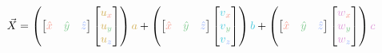 \documentclass[preview]{standalone}
\begin{document}
$$\vec{X} =
\left(\begin{bmatrix}\textcolor[HTML]{f59789}{\hat{x}}&\textcolor[HTML]{7dc98c}{\hat{y}}&\textcolor[HTML]{96b1fe}{\hat{z}}\end{bmatrix}\begin{bmatrix}\textcolor[HTML]{d2b057}{u}_{\textcolor[HTML]{f59789}{x}}\\\textcolor[HTML]{d2b057}{u}_{\textcolor[HTML]{7dc98c}{y}}\\\textcolor[HTML]{d2b057}{u}_{\textcolor[HTML]{96b1fe}{z}}\end{bmatrix}\right)\textcolor[HTML]{d2b057}{a} +
\left(\begin{bmatrix}\textcolor[HTML]{f59789}{\hat{x}}&\textcolor[HTML]{7dc98c}{\hat{y}}&\textcolor[HTML]{96b1fe}{\hat{z}}\end{bmatrix}\begin{bmatrix}\textcolor[HTML]{43c8dc}{v}_{\textcolor[HTML]{f59789}{x}}\\\textcolor[HTML]{43c8dc}{v}_{\textcolor[HTML]{7dc98c}{y}}\\\textcolor[HTML]{43c8dc}{v}_{\textcolor[HTML]{96b1fe}{z}}\end{bmatrix}\right)\textcolor[HTML]{43c8dc}{b} +
\left(\begin{bmatrix}\textcolor[HTML]{f59789}{\hat{x}}&\textcolor[HTML]{7dc98c}{\hat{y}}&\textcolor[HTML]{96b1fe}{\hat{z}}\end{bmatrix}\begin{bmatrix}\textcolor[HTML]{dd99d8}{w}_{\textcolor[HTML]{f59789}{x}}\\\textcolor[HTML]{dd99d8}{w}_{\textcolor[HTML]{7dc98c}{y}}\\\textcolor[HTML]{dd99d8}{w}_{\textcolor[HTML]{96b1fe}{z}}\end{bmatrix}\right)\textcolor[HTML]{dd99d8}{c}$$
\end{document}

